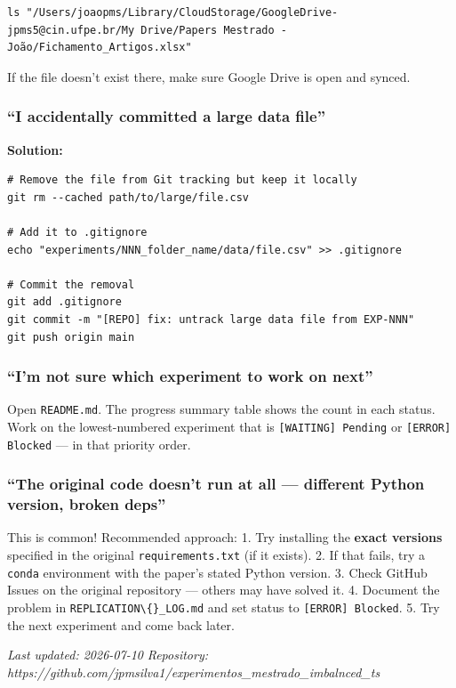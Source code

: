 \begin{verbatim}
ls "/Users/joaopms/Library/CloudStorage/GoogleDrive-jpms5@cin.ufpe.br/My Drive/Papers Mestrado - João/Fichamento_Artigos.xlsx"
\end{verbatim}

If the file doesn't exist there, make sure Google Drive is open and
synced.

\subsubsection{``I accidentally committed a large data
file''}\label{i-accidentally-committed-a-large-data-file}

\textbf{Solution:}

\begin{verbatim}
# Remove the file from Git tracking but keep it locally
git rm --cached path/to/large/file.csv

# Add it to .gitignore
echo "experiments/NNN_folder_name/data/file.csv" >> .gitignore

# Commit the removal
git add .gitignore
git commit -m "[REPO] fix: untrack large data file from EXP-NNN"
git push origin main
\end{verbatim}

\subsubsection{``I'm not sure which experiment to work on
next''}\label{im-not-sure-which-experiment-to-work-on-next}

Open \texttt{README.md}. The progress summary table
shows the count in each status. Work on the lowest-numbered experiment
that is \texttt{[WAITING] Pending} or
\texttt{[ERROR] Blocked} --- in that priority order.

\subsubsection{``The original code doesn't run at all --- different
Python version, broken
deps''}\label{the-original-code-doesnt-run-at-all-different-python-version-broken-deps}

This is common! Recommended approach: 1. Try installing the
\textbf{exact versions} specified in the original
\texttt{requirements.txt} (if it exists). 2. If that
fails, try a \texttt{conda} environment with the
paper's stated Python version. 3. Check GitHub Issues on the original
repository --- others may have solved it. 4. Document the problem in
\texttt{REPLICATION\textbackslash\{\}\_LOG.md} and set status to
\texttt{[ERROR] Blocked}. 5. Try the next experiment
and come back later.

\emph{Last updated: 2026-07-10} \emph{Repository:
https://github.com/jpmsilva1/experimentos\_mestrado\_imbalnced\_ts}
